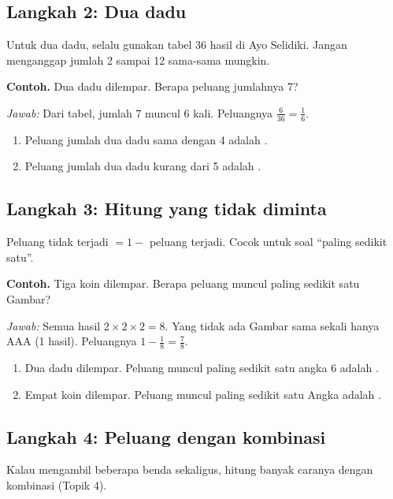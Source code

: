 \documentclass[11pt,a4paper]{article}
\begin{document}
\subsection*{Langkah 2: Dua dadu}
Untuk dua dadu, selalu gunakan tabel 36 hasil di Ayo Selidiki. Jangan menganggap jumlah 2 sampai
12 sama-sama mungkin.

\begin{contoh}
\textbf{Contoh.} Dua dadu dilempar. Berapa peluang jumlahnya 7?

\textit{Jawab:} Dari tabel, jumlah 7 muncul 6 kali. Peluangnya $\frac{6}{36} = \textbf{$\frac{1}{6}$}$.
\end{contoh}

\begin{giliranmu}
\begin{enumerate}[label=\alph*.]
    \item Peluang jumlah dua dadu sama dengan 4 adalah \kosong.
    \item Peluang jumlah dua dadu kurang dari 5 adalah \kosong.
\end{enumerate}
\end{giliranmu}

\subsection*{Langkah 3: Hitung yang tidak diminta}
Peluang tidak terjadi $= 1 -$ peluang terjadi. Cocok untuk soal ``paling sedikit satu''.

\begin{contoh}
\textbf{Contoh.} Tiga koin dilempar. Berapa peluang muncul paling sedikit satu Gambar?

\textit{Jawab:} Semua hasil $2 \times 2 \times 2 = 8$. Yang tidak ada Gambar sama sekali hanya
AAA (1 hasil). Peluangnya $1 - \frac{1}{8} = \textbf{$\frac{7}{8}$}$.
\end{contoh}

\begin{giliranmu}
\begin{enumerate}[label=\alph*.]
    \item Dua dadu dilempar. Peluang muncul paling sedikit satu angka 6 adalah \kosong.
    \item Empat koin dilempar. Peluang muncul paling sedikit satu Angka adalah \kosong.
\end{enumerate}
\end{giliranmu}

\subsection*{Langkah 4: Peluang dengan kombinasi}
Kalau mengambil beberapa benda sekaligus, hitung banyak caranya dengan kombinasi (Topik 4).
\end{document}
